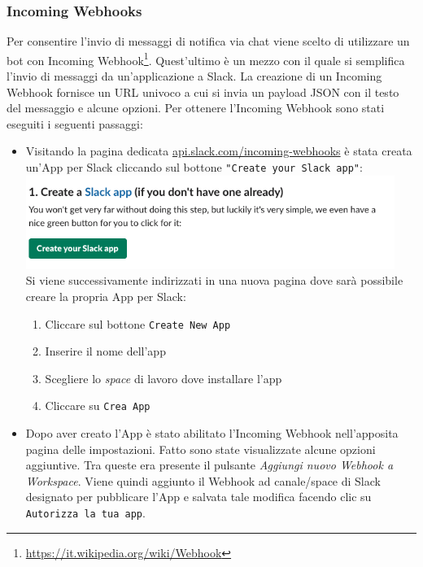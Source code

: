 \subsubsection{Incoming Webhooks}
Per consentire l'invio di messaggi di notifica via chat viene scelto di utilizzare un bot con Incoming Webhook\footnote{\href{https://it.wikipedia.org/wiki/Webhook}{https://it.wikipedia.org/wiki/Webhook}}. Quest'ultimo è un mezzo con il quale si semplifica l'invio di messaggi da un'applicazione a Slack. La creazione di un Incoming Webhook fornisce un URL univoco a cui si invia un payload JSON con il testo del messaggio e alcune opzioni.
Per ottenere l'Incoming Webhook sono stati eseguiti i seguenti passaggi:
\begin{itemize}
    \item Visitando la pagina dedicata \href{https://api.slack.com/incoming-webhooks}{api.slack.com/incoming-webhooks} è stata creata un'App per Slack cliccando sul bottone \texttt{"Create your Slack app"}:\\
    \includegraphics[width=12cm]{immagini/slack_bot.png}\\
    Si viene successivamente indirizzati in una nuova pagina dove sarà possibile creare la propria App per Slack:
	\begin{enumerate}
		\item Cliccare sul bottone \texttt{Create New App}
		\item Inserire il nome dell'app
		\item Scegliere lo \textit{space} di lavoro dove installare l'app
		\item Cliccare su \texttt{Crea App}
	\end{enumerate}
	\item Dopo aver creato l'App è stato abilitato l'Incoming Webhook nell'apposita pagina delle impostazioni. Fatto sono state visualizzate alcune opzioni aggiuntive. Tra queste era presente il pulsante \textit{Aggiungi nuovo Webhook a Workspace}. Viene quindi aggiunto il Webhook ad canale/space di Slack designato per pubblicare l'App e salvata tale modifica facendo clic su \texttt{Autorizza la tua app}.
\end{itemize} 
